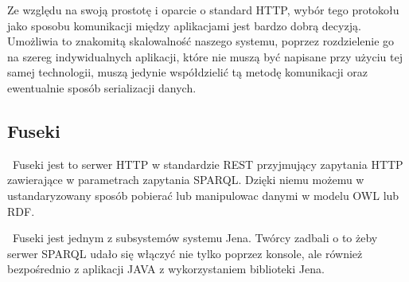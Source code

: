 Ze względu na swoją prostotę i oparcie o standard HTTP, wybór tego protokołu jako sposobu komunikacji między aplikacjami jest bardzo dobrą decyzją. Umożliwia to znakomitą skalowalność naszego systemu, poprzez rozdzielenie go na szereg indywidualnych aplikacji, które nie muszą być napisane przy użyciu tej samej technologii, muszą jedynie współdzielić tą metodę komunikacji oraz ewentualnie sposób serializacji danych.

\subsection{Fuseki}
\label{sec:rest}

~Fuseki jest to serwer HTTP w standardzie REST przyjmujący zapytania HTTP zawierające w parametrach zapytania SPARQL.
Dzięki niemu możemu w ustandaryzowany sposób pobierać lub manipulowac danymi w modelu OWL lub RDF.

~Fuseki jest jednym z subsystemów systemu Jena. Twórcy zadbali o to żeby serwer SPARQL udało się włączyć nie tylko poprzez konsole, ale również bezpośrednio z aplikacji JAVA z wykorzystaniem biblioteki Jena.


